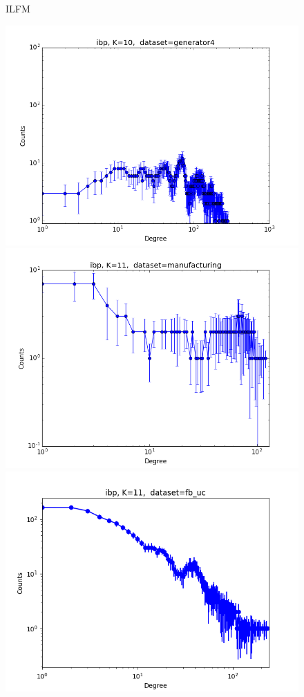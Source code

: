 \begin{figure}[ht]
    \vspace{0.2cm}
	 ILFM

	\includegraphics[scale=0.27]{img/expe/4_ibp/figure_1}
	\endminipage
	\includegraphics[scale=0.27]{img/expe/5_ibp/figure_1}
	\endminipage
	\includegraphics[scale=0.27]{img/expe/6_ibp/figure_1}

\end{figure}
